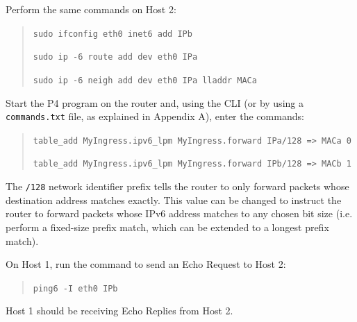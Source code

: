 Perform the same commands on Host 2:
\begin{quote}
    \texttt{sudo ifconfig eth0 inet6 add IPb}
    
    \texttt{sudo ip -6 route add dev eth0 IPa}
    
    \texttt{sudo ip -6 neigh add dev eth0 IPa lladdr MACa}
\end{quote}

Start the P4 program on the router and, using the CLI (or by using a \texttt{commands.txt} file, as explained in Appendix A), enter the commands:
\begin{quote}
    \texttt{table\_add MyIngress.ipv6\_lpm MyIngress.forward IPa/128 => MACa 0}
    
    \texttt{table\_add MyIngress.ipv6\_lpm MyIngress.forward IPb/128 => MACb 1}
\end{quote}

The \texttt{/128} network identifier prefix tells the router to only forward packets whose destination address matches exactly. This value can be changed to instruct the router to forward packets whose IPv6 address matches to any chosen bit size (i.e. perform a fixed-size prefix match, which can be extended to a longest prefix match).

On Host 1, run the command to send an Echo Request to Host 2:
\begin{quote}
    \texttt{ping6 -I eth0 IPb}
\end{quote}

Host 1 should be receiving Echo Replies from Host 2.